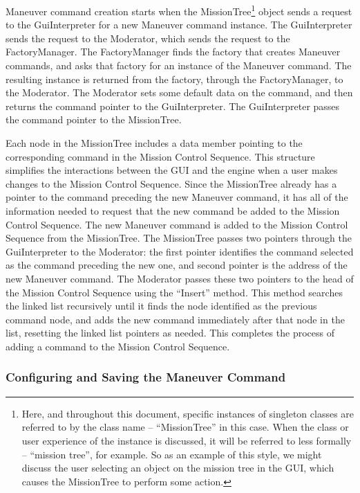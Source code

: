 Maneuver command creation starts when the MissionTree\footnote{Here, and throughout this document,
specific instances of singleton classes are referred to by the class name -- ``MissionTree'' in this
case.  When the class or user experience of the instance is discussed, it will be referred to
 less formally -- ``mission tree'', for example.  So as an example of this style, we might discuss
the user selecting an object on the mission tree in the GUI, which causes the MissionTree to perform
some action.} object sends a request to the GuiInterpreter for a new Maneuver command instance. The
GuiInterpreter sends the request to the Moderator, which sends the request to the FactoryManager.
The FactoryManager finds the factory that creates Maneuver commands, and asks that factory for an
instance of the Maneuver command.  The resulting instance is returned from the factory, through the
FactoryManager, to the Moderator.  The Moderator sets some default data on the command, and then
returns the command pointer to the GuiInterpreter. The GuiInterpreter passes the command pointer to
the MissionTree.

Each node in the MissionTree includes a data member pointing to the corresponding command in the
Mission Control Sequence.  This structure simplifies the interactions between the GUI and the engine
when a user makes changes to the Mission Control Sequence.  Since the MissionTree already has a
pointer to the command preceding the new Maneuver command, it has all of the information needed to
request that the new command be added to the Mission Control Sequence.  The new Maneuver command is
added to the Mission Control Sequence from the MissionTree.  The MissionTree passes two pointers
through the GuiInterpreter to the Moderator: the first pointer identifies the command selected as
the command preceding the new one, and second pointer is the address of the new Maneuver command.
The Moderator passes these two pointers to the head of the Mission Control Sequence using the
``Insert'' method. This method searches the linked list recursively until it finds the node
identified as the previous command node, and adds the new command immediately after that node in the
list, resetting the linked list pointers as needed.  This completes the process of adding a command
to the Mission Control Sequence.

\subsubsection{\label{section:CommandConfiguration}Configuring and Saving the Maneuver Command}


